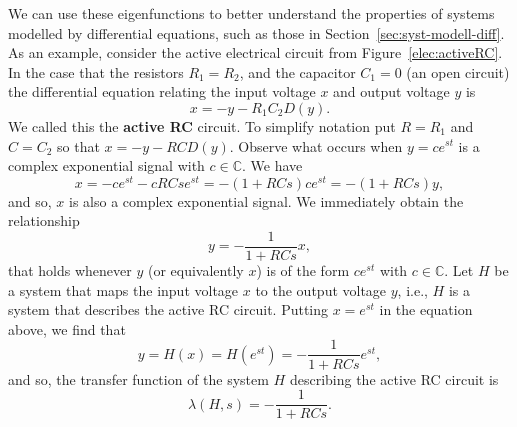 \documentclass[11pt,a4paper]{book}
\theoremstyle{plain}
\numberwithin{equation}{section}
\newcommand{\complex}{{\mathbb C}}
\newcommand{\term}{\textbf}
\begin{document}
We can use these eigenfunctions to better understand the properties of systems modelled by differential equations, such as those in Section~\ref{sec:syst-modell-diff}.  As an example, consider the active electrical circuit from Figure~\ref{elec:activeRC}.  In the case that the resistors $R_1 = R_2$, and the capacitor $C_1 = 0$ (an open circuit) the differential equation relating the input voltage $x$ and output voltage $y$ is
\[
x = - y - R_1 C_2 D(y).
\]
We called this the \term{active RC} circuit.  To simplify notation put $R = R_1$ and $C = C_2$ so that $x = -y - RCD(y)$.  
Observe what occurs when $y = c e^{st}$ is a complex exponential signal with $c \in \complex$.  We have
\[
x = - c e^{st} - c R C s e^{st} = -(1 + R C s) c e^{st} = -(1 + R C s) y,
\]
and so, $x$ is also a complex exponential signal.  We immediately obtain the relationship
\[
y = -\frac{1}{1 + R C s} x,
\]
that holds whenever $y$ (or equivalently $x$) is of the form $c e^{st}$ with $c \in \complex$.  Let $H$ be a system that maps the input voltage $x$ to the output voltage $y$, i.e., $H$ is a system that describes the active RC circuit.
Putting $x = e^{st}$ in the equation above, we find that 
\[
y = H(x) = H(e^{st}) =  -\frac{1}{1 + R C s} e^{st},
\]
and so, the transfer function of the system $H$ describing the active RC circuit is
\begin{equation}\label{eq:transferRCH}
\lambda(H,s) = -\frac{1}{1 + R C s}.
\end{equation}
\end{document}
